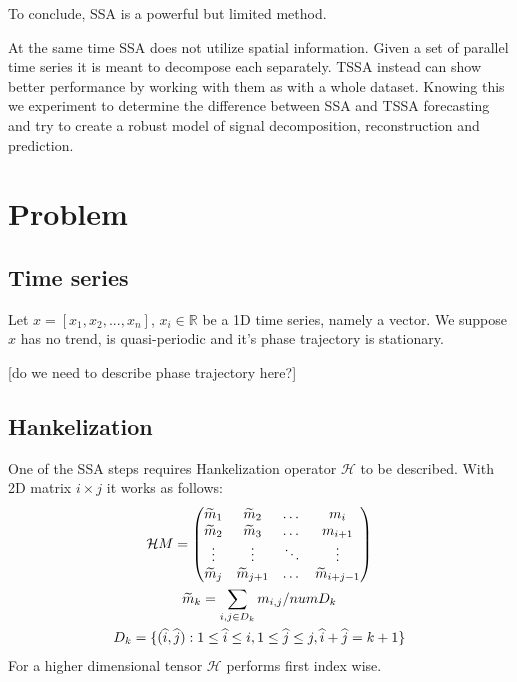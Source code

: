 \documentclass{article}
\begin{document}
To conclude, SSA is a powerful but limited method.

At the same time SSA does not utilize spatial information. Given a set of parallel time series it is meant to decompose each separately. TSSA instead can show better performance by working with them as with a whole dataset. Knowing this we experiment to determine the difference between SSA and TSSA forecasting and try to create a robust model of signal decomposition, reconstruction and prediction.
\section{Problem}
\label{sec:Problem}

\subsection{Time series}

Let \(x = \left[x_1, x_2, ..., x_n\right]\), \(x_i \in \mathbb{R}\) be a 1D time series, namely a vector. We suppose \(x\) has no trend, is quasi-periodic and it's phase trajectory is stationary.

[do we need to describe phase trajectory here?]

\subsection{Hankelization}

One of the SSA steps requires Hankelization operator \(\mathcal{H}\) to be described. With 2D matrix \(i \times j\) it works as follows:
\begin{gather}
\mathcal{H}M =
\begin{pmatrix}
	\widetilde{m}_{1} & \widetilde{m}_{2} & \dots & m_{i} \\
	\widetilde{m}_{2} & \widetilde{m}_{3} & \dots & m_{i + 1} \\
	\vdots & \vdots & \ddots & \vdots \\
	\widetilde{m}_{j} & \widetilde{m}_{j + 1} &  \dots & \widetilde{m}_{i + j - 1}
\end{pmatrix} \notag \\
\widetilde{m}_{k} = \sum_{i, j \in D_k} m_{i,j} / numD_k \\
D_k = \{(\widehat{i}, \widehat{j}) : 1 \leq \widehat{i} \leq i, 1 \leq \widehat{j} \leq j, \widehat{i} + \widehat{j} = k + 1\} \notag
\end{gather} 
For a  higher dimensional tensor \(\mathcal{H}\) performs first index wise.
\end{document}
